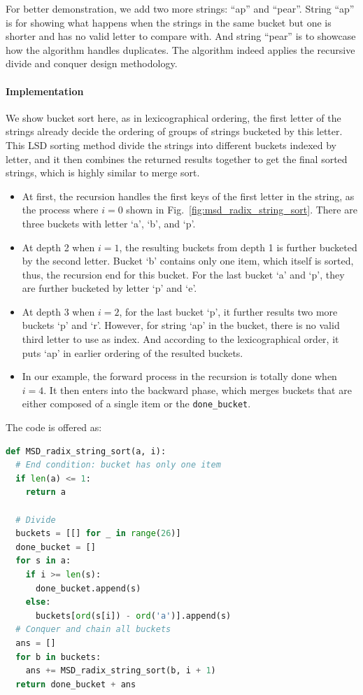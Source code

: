 \documentclass[../main.tex]{subfiles}
\begin{document}
For better demonstration, we add two more strings: ``ap'' and ``pear''. String ``ap'' is for showing what happens when the strings in the same bucket but one is shorter and has no valid letter to compare with. And string ``pear'' is to showcase how the algorithm handles duplicates. 
The algorithm  indeed applies the recursive divide and conquer design methodology. 

\paragraph{Implementation} We show bucket sort here, as in lexicographical ordering, the first letter of the strings already decide the ordering of groups of strings bucketed by this letter. This LSD sorting method divide the strings into different buckets indexed by letter, and it then combines the returned results together to get the final sorted strings, which is highly similar to merge sort.  %
\begin{itemize}
    \item At first, the recursion handles the first keys of the first letter in the string, as the process where $i=0$ shown in Fig.~\ref{fig:msd_radix_string_sort}. There are three buckets with letter `a', `b', and `p'. 
    \item At depth 2 when $i=1$, the resulting buckets from depth 1 is further bucketed by the second letter. Bucket `b' contains only one item, which itself is sorted, thus, the recursion end for this bucket. For the last bucket `a' and `p', they are further bucketed by letter `p' and `e'. 
    \item At depth 3 when $i=2$, for the last bucket `p', it further results two more buckets `p' and `r'. However, for string `ap' in the bucket, there is no valid third letter to use as index. And according to the lexicographical order, it puts `ap' in earlier ordering of the resulted buckets. \item In our example, the forward process in the recursion is totally done when $i=4$. It then enters into the backward phase, which merges buckets that are either composed of a single item or the \texttt{done\_bucket}. 
\end{itemize}

The code is offered as:
\begin{lstlisting}[language=Python]
def MSD_radix_string_sort(a, i):
  # End condition: bucket has only one item
  if len(a) <= 1:
    return a

  # Divide
  buckets = [[] for _ in range(26)]
  done_bucket = []
  for s in a:
    if i >= len(s):
      done_bucket.append(s)
    else:
      buckets[ord(s[i]) - ord('a')].append(s)
  # Conquer and chain all buckets
  ans = []
  for b in buckets:
    ans += MSD_radix_string_sort(b, i + 1)
  return done_bucket + ans
\end{lstlisting}
\end{document}
